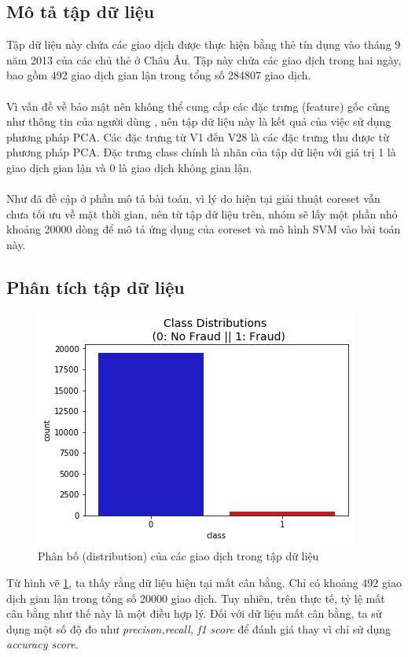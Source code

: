 \documentclass[a4paper, 12pt, oneside]{report}
\begin{document}
\subsection{Mô tả tập dữ liệu}
Tập dữ liệu này chứa các giao dịch được thực hiện bằng thẻ tín dụng vào tháng 9 năm 2013 của các chủ thẻ ở Châu Âu. Tập này chứa các giao dịch trong hai ngày, bao gồm 492 giao dịch gian lận trong tổng số 284807 giao dịch.\\ \\
Vì vấn đề về bảo mật nên không thể cung cấp các đặc trưng (feature) gốc cũng như thông tin của người dùng , nên tập dữ liệu này là kết quả của việc sử dụng phương pháp PCA. Các đặc trưng từ V1 đến V28 là các đặc trưng thu được từ phương pháp PCA. Đặc trưng class chính là nhãn của tập dữ liệu với giá trị 1 là giao dịch gian lận và 0 là giao dịch không gian lận.\\ \\
Như đã đề cập ở phần mô tả bài toán, vì lý do hiện tại giải thuật coreset vẫn chưa tối ưu về mặt thời gian, nên từ tập dữ liệu trên, nhóm sẽ lấy một phần nhỏ khoảng 20000 dòng để mô tả ứng dụng của coreset và mô hình SVM vào bài toán này.

\subsection{Phân tích tập dữ liệu}
\begin{center}
    \begin{figure}[H]
    \begin{center}
     \includegraphics[scale=0.6]{creditCardFraud_distribution_class.png}
    \end{center}
    \caption{Phân bố (distribution) của các giao dịch trong tập dữ liệu}
    \label{Hình 5.1}
    \end{figure}
\end{center}
Từ hình vẽ \ref{Hình 5.1}, ta thấy rằng dữ liệu hiện tại mất cân bằng. Chỉ có khoảng 492 giao dịch gian lận trong tổng số 20000 giao dịch. Tuy nhiên, trên thực tế, tỷ lệ mất cân bằng như thế này là một điều hợp lý. Đối với dữ liệu mất cân bằng, ta sử dụng một số độ đo như \textit{precison,recall, f1 score} để đánh giá thay vì chỉ sử dụng \textit{accuracy score}.\\
\end{document}
